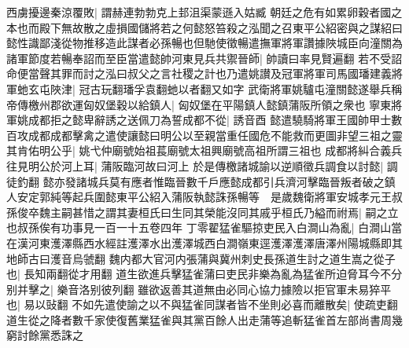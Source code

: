 西虜擾邊秦涼覆敗|{
	謂赫連勃勃克上邽沮渠蒙遜入姑臧}
朝廷之危有如累卵穀者國之本也而殿下無故散之虛損國儲將若之何懿怒笞殺之泓聞之召東平公紹密與之謀紹曰懿性識鄙淺從物推移造此謀者必孫暢也但馳使徵暢遣撫軍將軍讚據陜城臣向潼關為諸軍節度若暢奉詔而至臣當遣懿帥河東見兵共禦晉師|{
	帥讀曰率見賢遍翻}
若不受詔命便當聲其罪而討之泓曰叔父之言社稷之計也乃遣姚讃及冠軍將軍司馬國璠建義將軍虵玄屯陜津|{
	冠古玩翻璠孚袁翻虵以者翻又如字}
武衛將軍姚驢屯潼關懿遂舉兵稱帝傳檄州郡欲運匈奴堡穀以給鎮人|{
	匈奴堡在平陽鎮人懿鎮蒲阪所領之衆也}
寧東將軍姚成都拒之懿卑辭誘之送佩刀為誓成都不從|{
	誘音酉}
懿遣驍騎將軍王國帥甲士數百攻成都成都擊禽之遣使讓懿曰明公以至親當重任國危不能救而更圖非望三祖之靈其肯佑明公乎|{
	姚弋仲廟號始祖萇廟號太祖興廟號高祖所謂三祖也}
成都將糾合義兵往見明公於河上耳|{
	蒲阪臨河故曰河上}
於是傳檄諸城諭以逆順徵兵調食以討懿|{
	調徒釣翻}
懿亦發諸城兵莫有應者惟臨晉數千戶應懿成都引兵濟河擊臨晉叛者破之鎮人安定郭純等起兵圍懿東平公紹入蒲阪執懿誅孫暢等　是歲魏衛將軍安城孝元王叔孫俊卒魏主嗣甚惜之謂其妻桓氏曰生同其榮能沒同其戚乎桓氏乃縊而祔焉|{
	嗣之立也叔孫俟有功事見一百一十五卷四年}
丁零翟猛雀驅掠吏民入白澗山為亂|{
	白澗山當在漢河東濩澤縣西水經註濩澤水出濩澤城西白澗嶺東逕濩澤濩澤唐澤州陽城縣即其地師古曰濩音烏虢翻}
魏内都大官河内張蒲與冀州刺史長孫道生討之道生嵩之從子也|{
	長知兩翻從才用翻}
道生欲進兵擊猛雀蒲曰吏民非樂為亂為猛雀所迫脅耳今不分别并擊之|{
	樂音洛别彼列翻}
雖欲返善其道無由必同心協力據險以拒官軍未易猝平也|{
	易以䜴翻}
不如先遣使諭之以不與猛雀同謀者皆不坐則必喜而離散矣|{
	使疏吏翻}
道生從之降者數千家使復舊業猛雀與其黨百餘人出走蒲等追斬猛雀首左部尚書周幾窮討餘黨悉誅之

